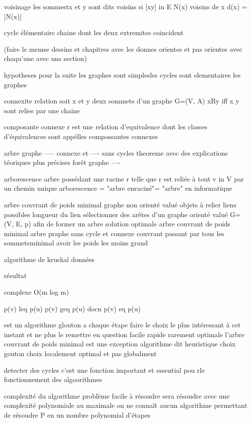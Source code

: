 \documentclass{article}
\begin{document}
voisinage les sommestx et y sont dits voisins si [xy] in E
N(x) voisins de x
d(x) = |N(x)|

cycle élémentaire chaine dont les deux extremites coincident

(faire le memse dessins et chapitres avec les donnes orientes et pas orientes avec chaqu'une avec uns section)

hypotheses pour la suite
les graphes sont simplesles cycles sont elementaires
les graphes 

connexite relation soit x et y deux sommets d'un graphe G=(V, A) xRy iff x y sont relies par une chaine

composante connexe r est une relation d'equivalence dont les classes d'équivalences sont appélles compossantes connexes

arbre
graphe ----- connexe et ---- sans cycles
theoreme avec des explications téoriques plus précises
forêt
graphe ----

arborescence
arbre possédant une racine r telle que r est reliée à tout v in V par un chemin unique
arborescence = "arbre enraciné"= "arbre" en informatique

arbre couvrant de poids minimal
    graphe non orienté valué
    objets à relier
    liens possibles
    longueur du lien
sélectionner des arêtes d'un graphe orienté valué G=(V, E, p) afin de former un arbre
solution optimale arbre couvrant de poids minimal
arbre praphe sans cycle et connexe
couvrant passant par tous les sommetsminimal avoir les poids les moins grand


algorithme de kruskal
données

résultat

complexe O(m log m)

p(v) leq p(u)
p(v) geq p(u)
docn p(v) eq p(u)

est un algorithme glouton
    a chaque étape faire le choix le plus intéressant à cet instant et ne plus le remettre en question
        facile 
        rapide
        rarement optimale
            l'arbre couvrant de poids minimal est une exception
            algorithme dit heuristique
        choix gouton choix localement optimal et pas globalment 

    detecter des cycles c'est une fonction important et essential pou rle fonctionnement des algoorithmes



complexité du algorithme
problème facile à résoudre sera résoudre avec une complexité polynomiale au maximale
on ne connaît aucun algorithme permettant de résoudre P en un nombre polynomial d'étapes
\end{document}
